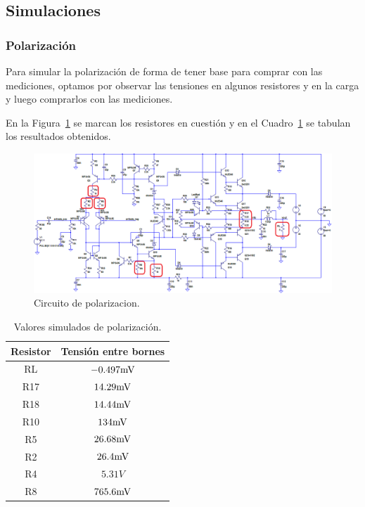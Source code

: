 \subsection{Simulaciones}
\bigskip
\subsubsection{Polarización}

Para simular la polarización de forma de tener base para comprar con las mediciones, optamos por observar las tensiones en algunos resistores y en la carga y luego comprarlos con las mediciones.

En la Figura~\ref{circ_pol} se marcan los resistores en cuestión y en el Cuadro~\ref{sim_pol_tabla} se tabulan los resultados obtenidos.

\begin{figure}[H]
\centering
\centerline{
\includegraphics[width=\textwidth]{img/circ_pol.png}}
\caption{Circuito de polarizacion.}
\label{circ_pol} 
\end{figure}

\begin{center}
\begin{table}[H]
\begin{tabular}{|c|c|}
\hline 
\textbf{Resistor} & \textbf{Tensión entre bornes} \\ 
\hline 
RL & $-0.497\mbox{mV}$ \\ 
\hline 
R17 & $14.29\mbox{mV}$ \\ 
\hline 
R18 & $14.44\mbox{mV}$ \\ 
\hline 
R10 & $134\mbox{mV}$ \\ 
\hline
R5 & $26.68\mbox{mV}$ \\ 
\hline
R2 & $26.4\mbox{mV}$ \\ 
\hline
R4 & $5.31V$ \\ 
\hline
R8 & $765.6\mbox{mV}$ \\ 
\hline
\end{tabular}
\centering
\caption{Valores simulados de polarización.}
\label{sim_pol_tabla}
\end{table}
\end{center}

